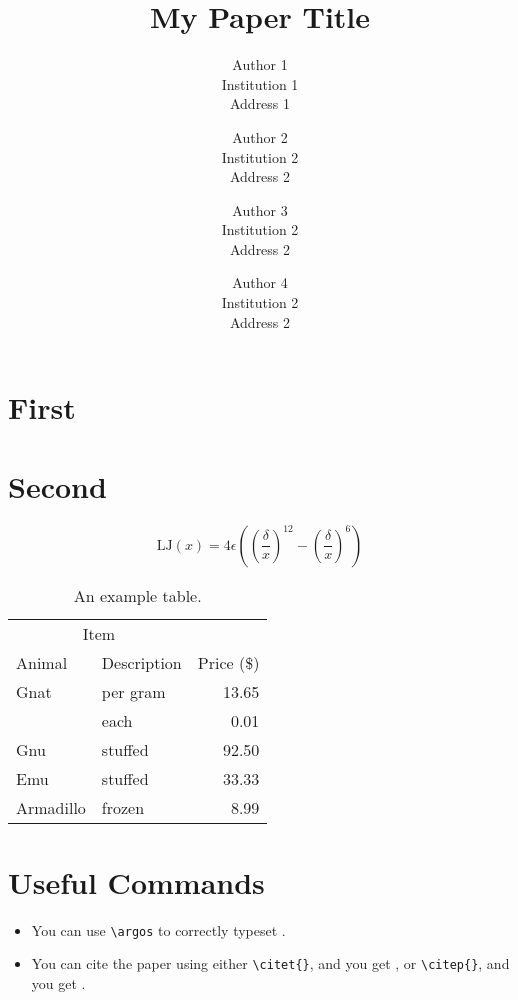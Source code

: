\documentclass{nestpaper}
\title{My Paper Title}
\author{
  Author 1\\
  Institution 1 \\
  Address 1 \\
  \email{author1@institution1.edu}
  \and
  Author 2\\
  Institution 2 \\
  Address 2 \\
  \email{author2@institution2.edu}
  \and
  Author 3\\
  Institution 2 \\
  Address 2 \\
  \email{author2@institution2.edu}
  \and
  Author 4\\
  Institution 2 \\
  Address 2 \\
  \email{author2@institution2.edu}}
\begin{document}

\maketitle

\begin{abstract}
\lipsum[1]
\end{abstract}

\section{First}
\lipsum[1-6]

\section{Second}
\lipsum[9]
\begin{equation}
  \text{LJ}(x) = 4\epsilon\left(\left(\frac{\delta}{x}\right)^{12} - \left(\frac{\delta}{x}\right)^6\right)
\end{equation}

\lipsum[10]

\begin{table}[t]
  \centering
  \caption{An example table.}
  \begin{tabular}{@{}llr@{}}
    \toprule
    \multicolumn{2}{c}{Item} \\
    \cmidrule(r){1-2}
    Animal    & Description & Price (\$)\\
    \midrule
    Gnat      & per gram    & 13.65     \\
              & each        & 0.01      \\
    Gnu       & stuffed     & 92.50     \\
    Emu       & stuffed     & 33.33     \\
    Armadillo & frozen      & 8.99      \\
    \bottomrule
  \end{tabular}
\end{table}

\section{Useful Commands}
\begin{itemize}
\item You can use \verb|\argos| to correctly typeset \argos.
\item You can cite the paper using either \verb|\citet{}|, and you get \citet{Pinciroli:SI2012}, or \verb|\citep{}|, and you get \citep{Pinciroli:SI2012}.
\end{itemize}
\end{document}
